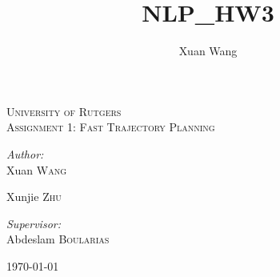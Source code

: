\documentclass[12pt]{amsart}
\title{NLP_HW3}
\author{Xuan Wang}
\date{} %
\begin{document}
\begin{titlepage}

\begin{center}



\textsc{\LARGE University of Rutgers}\\[1.5cm]

\textsc{\Large Assignment 1: Fast Trajectory Planning}\\[0.5cm]


\begin{minipage}{0.4\textwidth}
\begin{flushleft} \large
\emph{Author:}\\
Xuan \textsc{Wang}

Xunjie \textsc{Zhu}
\end{flushleft}
\end{minipage}
\begin{minipage}{0.4\textwidth}
\begin{flushright} \large
\emph{Supervisor:} \\
Abdeslam  \textsc{Boularias}
\end{flushright}
\end{minipage}

\vfill

{\large \today}

\end{center}

\end{titlepage}

%
%
%
%
%
%
\end{document}
